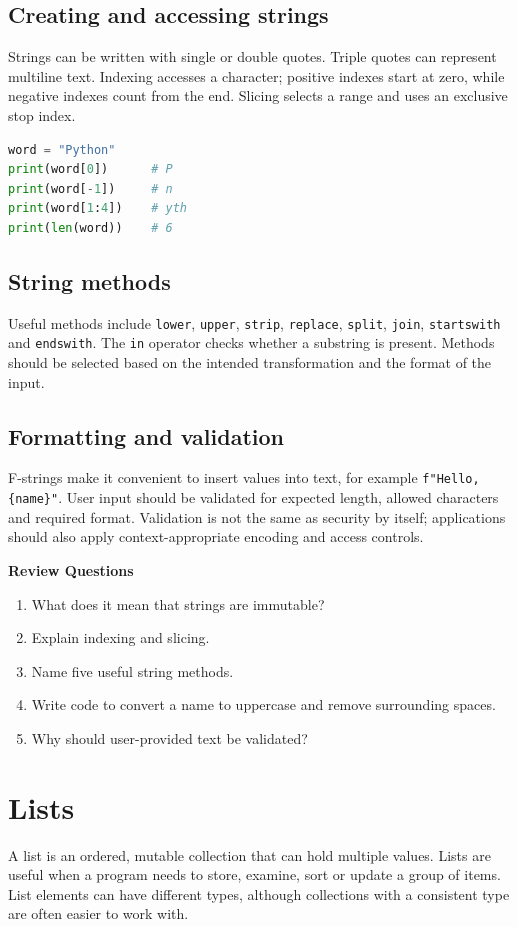 \documentclass[11pt,openany,oneside]{book}
\newcommand{\reviewtitle}{\par\noindent\textbf{\color{Navy}Review Questions}\par}
\begin{document}
\section{Creating and accessing strings}
Strings can be written with single or double quotes. Triple quotes can represent multiline text. Indexing accesses a character; positive indexes start at zero, while negative indexes count from the end. Slicing selects a range and uses an exclusive stop index.

\begin{lstlisting}[style=webcode,language=Python]
word = "Python"
print(word[0])      # P
print(word[-1])     # n
print(word[1:4])    # yth
print(len(word))    # 6
\end{lstlisting}

\section{String methods}
Useful methods include \texttt{lower}, \texttt{upper}, \texttt{strip}, \texttt{replace}, \texttt{split}, \texttt{join}, \texttt{startswith} and \texttt{endswith}. The \texttt{in} operator checks whether a substring is present. Methods should be selected based on the intended transformation and the format of the input.

\section{Formatting and validation}
F-strings make it convenient to insert values into text, for example \texttt{f"Hello, \{name\}"}. User input should be validated for expected length, allowed characters and required format. Validation is not the same as security by itself; applications should also apply context-appropriate encoding and access controls.

\reviewtitle
\begin{enumerate}
\item What does it mean that strings are immutable?
\item Explain indexing and slicing.
\item Name five useful string methods.
\item Write code to convert a name to uppercase and remove surrounding spaces.
\item Why should user-provided text be validated?
\end{enumerate}

\chapter{Lists}
A list is an ordered, mutable collection that can hold multiple values. Lists are useful when a program needs to store, examine, sort or update a group of items. List elements can have different types, although collections with a consistent type are often easier to work with.
\end{document}
